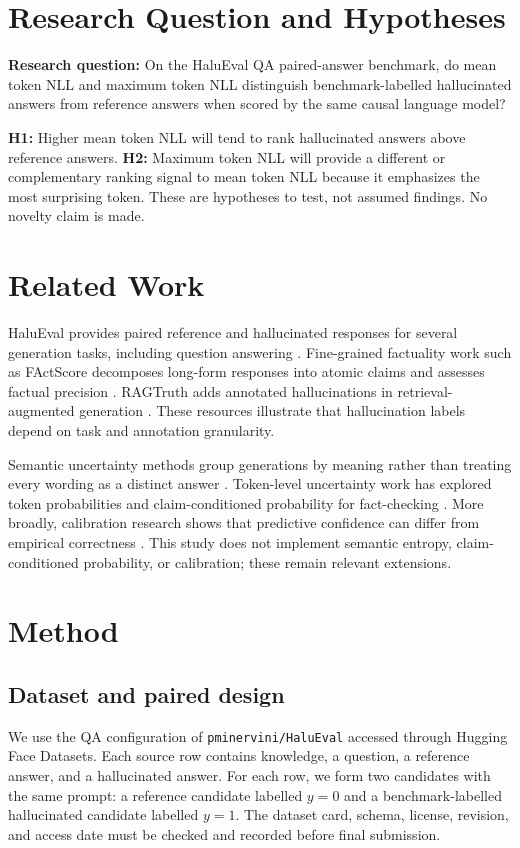 \documentclass[10pt]{article}
\begin{document}
\section{Research Question and Hypotheses}
\textbf{Research question:} On the HaluEval QA paired-answer benchmark, do mean token NLL and maximum token NLL distinguish benchmark-labelled hallucinated answers from reference answers when scored by the same causal language model?

\textbf{H1:} Higher mean token NLL will tend to rank hallucinated answers above reference answers. \textbf{H2:} Maximum token NLL will provide a different or complementary ranking signal to mean token NLL because it emphasizes the most surprising token. These are hypotheses to test, not assumed findings. No novelty claim is made.

\section{Related Work}
HaluEval provides paired reference and hallucinated responses for several generation tasks, including question answering \cite{li2023halueval}. Fine-grained factuality work such as FActScore decomposes long-form responses into atomic claims and assesses factual precision \cite{min2023factscore}. RAGTruth adds annotated hallucinations in retrieval-augmented generation \cite{niu2024ragtruth}. These resources illustrate that hallucination labels depend on task and annotation granularity.

Semantic uncertainty methods group generations by meaning rather than treating every wording as a distinct answer \cite{kuhn2023semantic,farquhar2024semantic}. Token-level uncertainty work has explored token probabilities and claim-conditioned probability for fact-checking \cite{fadeeva2024factchecking}. More broadly, calibration research shows that predictive confidence can differ from empirical correctness \cite{guo2017calibration}. This study does not implement semantic entropy, claim-conditioned probability, or calibration; these remain relevant extensions.

\section{Method}
\subsection{Dataset and paired design}
We use the QA configuration of \texttt{pminervini/HaluEval} accessed through Hugging Face Datasets. Each source row contains knowledge, a question, a reference answer, and a hallucinated answer. For each row, we form two candidates with the same prompt: a reference candidate labelled $y=0$ and a benchmark-labelled hallucinated candidate labelled $y=1$. The dataset card, schema, license, revision, and access date must be checked and recorded before final submission.
\end{document}
